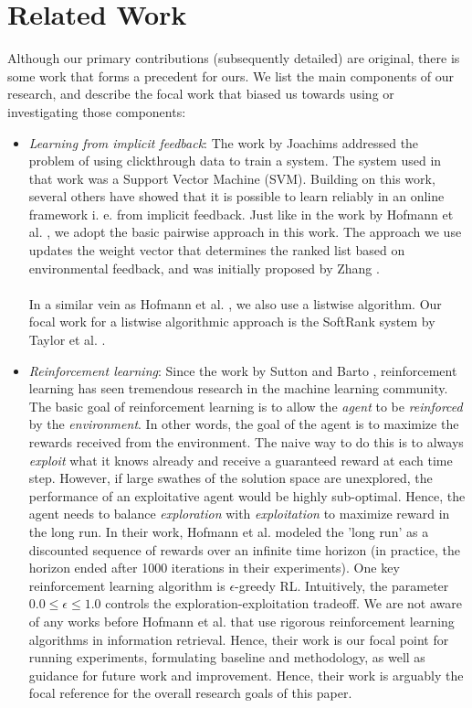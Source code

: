 \documentclass{acm_proc_article-sp}
\begin{document}
\section{Related Work}
Although our primary contributions (subsequently detailed) are original, there is some work that forms a precedent for ours. We list the main components of our research, and describe the focal work that biased us towards using or investigating those components:
\begin{itemize}
\item \emph{Learning from implicit feedback}: The work by Joachims \cite{joachims} addressed the problem of using clickthrough data to train a system. The system used in that work was a Support Vector Machine (SVM). Building on this work, several others have showed that it is possible to learn reliably in an online framework i. e. from implicit feedback. Just like in the work by Hofmann et al. \cite{hofmann}, we adopt the basic pairwise approach in this work. The approach we use updates the weight vector that determines the ranked list based on environmental feedback, and was initially proposed by Zhang \cite{zhang}. \\ \\
 In a similar vein as Hofmann et al. \cite{hofmann}, we also use a listwise algorithm. Our focal work for a listwise algorithmic approach is the SoftRank system by Taylor et al. \cite{taylor}. 
\item \emph{Reinforcement learning}: Since the work by Sutton and Barto \cite{rl}, reinforcement learning has seen tremendous research in the machine learning community. The basic goal of reinforcement learning is to allow the \emph{agent} to be \emph{reinforced} by the \emph{environment}. In other words, the goal of the agent is to maximize the rewards received from the environment. The naive way to do this is to always \emph{exploit} what it knows already and receive a guaranteed reward at each time step. However, if large swathes of the solution space are unexplored, the performance of an exploitative agent would be highly sub-optimal. Hence, the agent needs to balance \emph{exploration} with \emph{exploitation} to maximize reward in the long run. In their work, Hofmann et al. modeled the 'long run' as a discounted sequence of rewards over an infinite time horizon (in practice, the horizon ended after 1000 iterations in their experiments). One key reinforcement learning algorithm is $\epsilon$-greedy RL. Intuitively, the parameter $0.0 \leq \epsilon \leq 1.0$ controls the exploration-exploitation tradeoff. We are not aware of any works before Hofmann et al. \cite{hofmann} that use rigorous reinforcement learning algorithms in information retrieval. Hence, their work is our focal point for running experiments, formulating baseline and methodology, as well as guidance for future work and improvement. Hence, their work is arguably the focal reference for the overall research goals of this paper. \\ \\

\end{itemize}
\end{document}
